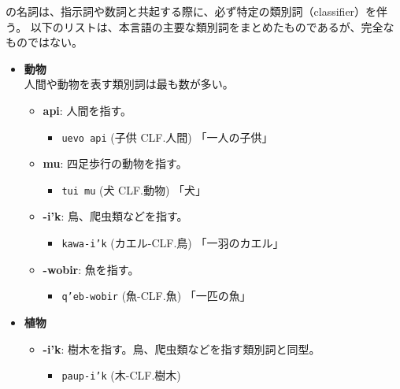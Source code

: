 \langname の名詞は、指示詞や数詞と共起する際に、必ず特定の類別詞（classifier）を伴う。
以下のリストは、本言語の主要な類別詞をまとめたものであるが、完全なものではない。

\begin{itemize}
    \item \textbf{動物}\\
    人間や動物を表す類別詞は最も数が多い。
        \begin{itemize}
            \item \textbf{api}: 人間を指す。
                \begin{itemize}
                    \item \texttt{uevo api} (子供 CLF.人間)
                    \quad 「一人の子供」
                \end{itemize}
            \item \textbf{mu}: 四足歩行の動物を指す。
                \begin{itemize}
                    \item \texttt{tui mu} (犬 CLF.動物)
                    \quad 「犬」
                \end{itemize}
            \item \textbf{-i'k}: 鳥、爬虫類などを指す。
                \begin{itemize}
                    \item \texttt{kawa-i'k} (カエル-CLF.鳥) %
                    \quad 「一羽のカエル」
                \end{itemize}
            \item \textbf{-wobir}: 魚を指す。
                \begin{itemize}
                    \item \texttt{q'eb-wobir} (魚-CLF.魚) %
                    \quad 「一匹の魚」
                \end{itemize}
        \end{itemize}
    \item \textbf{植物} %
        \begin{itemize}
            \item \textbf{-i'k}: 樹木を指す。鳥、爬虫類などを指す類別詞と同型。
                \begin{itemize}
                    \item \texttt{paup-i'k} (木-CLF.樹木) %

\end{itemize}
\end{itemize}
\end{itemize}
